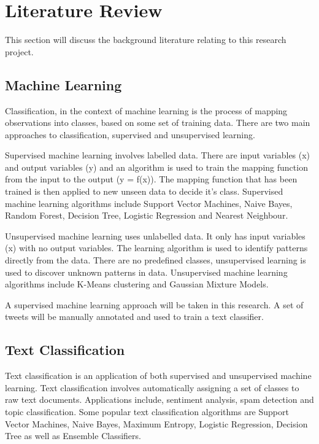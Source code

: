 \chapter{Literature Review}

This section will discuss the background literature relating to this research project.

\section{Machine Learning}

Classification, in the context of machine learning is the process of mapping observations into classes, based on some set of training data. There are two main approaches to classification, supervised and unsupervised learning. 

Supervised machine learning  \cite{supervised2007} involves labelled data. There are input variables (x) and output variables (y) and an algorithm is used to train the mapping function from the input to the output (y = f(x)). The mapping function that has been trained is then applied to new unseen data to decide it's class. Supervised machine learning algorithms include Support Vector Machines, Naive Bayes, Random Forest, Decision Tree, Logistic Regression and Nearest Neighbour.

Unsupervised machine learning uses unlabelled data. It only has input variables (x) with no output variables. The learning algorithm is used to identify patterns directly from the data. There are no predefined classes, unsupervised learning is used to discover unknown patterns in data. Unsupervised machine learning algorithms include K-Means clustering and Gaussian Mixture Models. 

A supervised machine learning approach will be taken in this research. A set of tweets will be manually annotated and used to train a text classifier.

\section{Text Classification}

Text classification \cite{khan2010} is an application of both supervised and unsupervised machine learning. Text classification involves automatically assigning a set of classes to raw text documents. Applications include, sentiment analysis, spam detection and topic classification. Some popular text classification algorithms are Support Vector Machines, Naive Bayes, Maximum Entropy, Logistic Regression, Decision Tree as well as Ensemble Classifiers.

